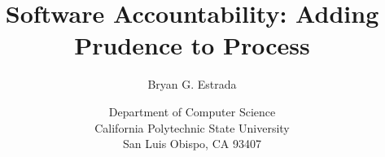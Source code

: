 \documentclass[12pt]{article}
\begin{document}
\title{Software Accountability: Adding Prudence to Process}
\author{Bryan G. Estrada}
\date{Department of Computer Science\\
      California Polytechnic State University\\
      San Luis Obispo, CA  93407}
      
\begin{titlepage}
\maketitle\thispagestyle{empty}
\end{titlepage}

\doublespace
\newpage
\tableofcontents
\listoffigures
\listoftables
\newpage








\newpage


\end{document}
